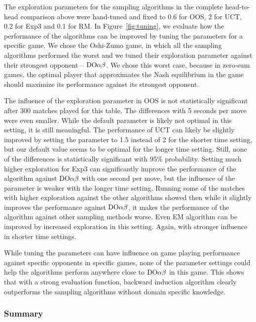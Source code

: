 The exploration parameters for the sampling algorithms in the complete head-to-head comparison above were hand-tuned and fixed to 0.6 for OOS, 2 for UCT, 0.2 for Exp3 and 0.1 for RM. In Figure~\ref{fig:tuning}, we evaluate how the performance of the algorithms can be improved by tuning the parameters for a specific game. We chose the Oshi-Zumo game, in which all the sampling algorithms performed the worst and we tuned their exploration parameter against their strongest opponent -- $\textrm{DO}\alpha\beta$. We chose this worst case, because in zero-sum games, the optimal player that approximates the Nash equilibrium in the game should maximize its performance against its strongest opponent.

The influence of the exploration parameter in OOS is not statistically significant after 300 matches played for this table. The differences with 5 seconds per move were even smaller. While the default parameter is likely not optimal in this setting, it is still meaningful.
The performance of UCT can likely be slightly improved by setting the parameter to 1.5 instead of 2 for the shorter time setting, but our default value seems to be optimal for the longer time setting. Still, none of the differences is statistically significant with 95\% probability.
Setting much higher exploration for Exp3 can significantly improve the performance of the algorithm against $\textrm{DO}\alpha\beta$ with one second per move, but the influence of the parameter is weaker with the longer time setting. Running some of the matches with higher exploration against the other algorithms showed then while it slightly improves the performance against $\textrm{DO}\alpha\beta$, it makes the performance of the algorithm against other sampling methods worse.
Even EM algorithm can be improved by increased exploration in this setting. Again, with stronger influence in shorter time settings. 

While tuning the parameters can have influence on game playing performance against specific opponents in specific games, none of the parameter settings could help the algorithms perform anywhere close to $\textrm{DO}\alpha\beta$ in this game. This shows that with a strong evaluation function, backward induction algorithm clearly outperforms the sampling algorithms without domain specific knowledge.

\subsubsection{Summary}

